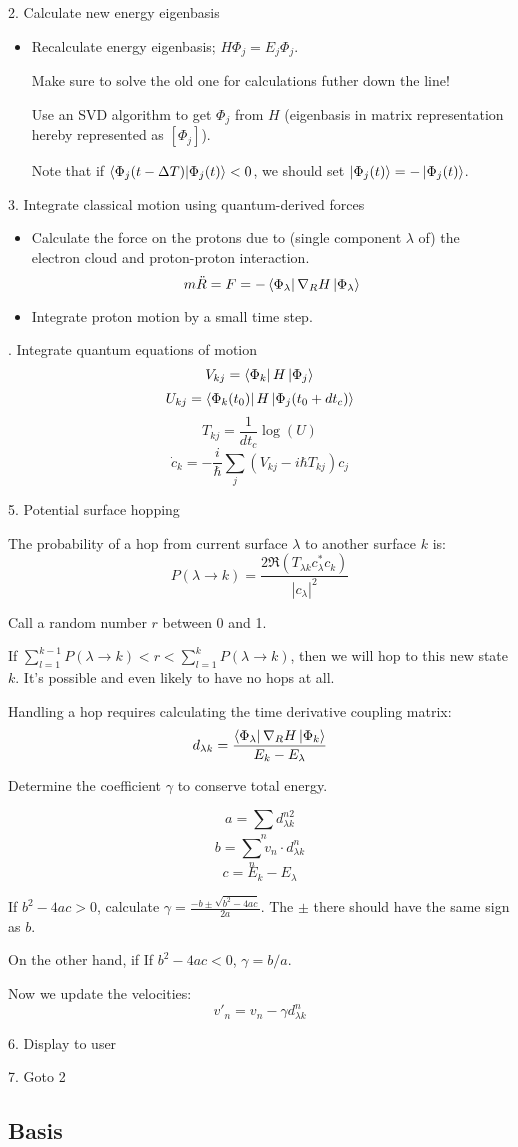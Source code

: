 \documentclass[12pt]{article}
\newcommand{\eigbasis}[0]{[\Phi_j]}
\begin{document}
2. Calculate new energy eigenbasis
\begin{itemize}
    \item Recalculate energy eigenbasis; $H\Phi_j = E_j\Phi_j$.

        Make sure to solve the old one for calculations futher down the line!

        Use an SVD algorithm to get $\Phi_j$ from $H$ (eigenbasis in matrix representation hereby represented as $\eigbasis$).

        Note that if $\bra{\Phi_j(t - \Delta T)}\ket{\Phi_j(t)} < 0$, we should set $\ket{\Phi_j(t)} = -\ket{\Phi_j(t)}$.
\end{itemize}

3. Integrate classical motion using quantum-derived forces
\begin{itemize}
    \item Calculate the force on the protons due to (single component $\lambda$ of) the electron cloud and proton-proton interaction.
        \[ m\ddot{R} = F = -\bra{\Phi_\lambda}\nabla_R H\ket{\Phi_\lambda} \]

    \item Integrate proton motion by a small time step.
\end{itemize}

. Integrate quantum equations of motion
\[ V_{kj} = \bra{\Phi_k}H\ket{\Phi_j} \]
\[ U_{kj} = \bra{\Phi_k(t_0)}H\ket{\Phi_j(t_0 + dt_c)} \]
\[ T_{kj} = \frac{1}{dt_c}\log(U) \]
\[ \dot{c}_k = -\frac{i}{\hbar} \sum_j (V_{kj} - i\hbar T_{kj})c_j \]

5. Potential surface hopping

The probability of a hop from current surface $\lambda$ to another surface $k$ is:
\[ P(\lambda\to k) = \frac{2\Re(T_{\lambda k} c_\lambda^* c_k)}{|c_\lambda|^2} \]

Call a random number $r$ between 0 and 1. 

If $\sum_{l=1}^{k-1} P(\lambda\to k) < r < \sum_{l=1}^k P(\lambda\to k)$, then we will hop to this new state $k$. It's possible and even likely to have no hops at all.

Handling a hop requires calculating the time derivative coupling matrix:
\[ d_{\lambda k} = \frac{\bra{\Phi_\lambda}\nabla_R H\ket{\Phi_k}}{E_k - E_\lambda} \]

Determine the coefficient $\gamma$ to conserve total energy.

\[ a = \sum_n d_{\lambda k}^{n2} \]
\[ b = \sum_n v_n \cdot d_{\lambda k}^{n} \]
\[ c = E_k - E_\lambda \]

If $b^2 - 4ac > 0$, calculate $\gamma = \frac{-b \pm \sqrt{b^2 - 4ac}}{2a}$. The $\pm$ there should have the same sign as $b$.

On the other hand, if If $b^2 - 4ac < 0$, $\gamma = b / a$.

Now we update the velocities:
\[ v'_n = v_n - \gamma d^n_{\lambda k} \]

6. Display to user

7. Goto 2

\subsection{Basis}
\end{document}
